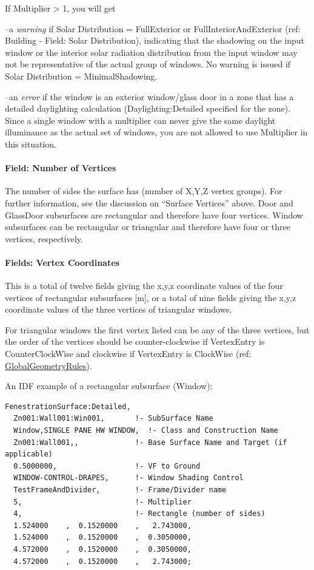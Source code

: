 If Multiplier \textgreater{} 1, you will get

--a \emph{warning} if Solar Distribution = FullExterior or FullInteriorAndExterior (ref: Building - Field: Solar Distribution), indicating that the shadowing on the input window or the interior solar radiation distribution from the input window may not be representative of the actual group of windows. No warning is issued if Solar Distribution = MinimalShadowing.

--an \emph{error} if the window is an exterior window/glass door in a zone that has a detailed daylighting calculation (Daylighting:Detailed specified for the zone). Since a single window with a multiplier can never give the same daylight illuminance as the actual set of windows, you are not allowed to use Multiplier in this situation.

\paragraph{Field: Number of Vertices}\label{field-number-of-vertices-4}

The number of sides the surface has (number of X,Y,Z vertex groups). For further information, see the discussion on ``Surface Vertices'' above. Door and GlassDoor subsurfaces are rectangular and therefore have four vertices. Window subsurfaces can be rectangular or triangular and therefore have four or three vertices, respectively.

\paragraph{Fields: Vertex Coordinates}\label{fields-vertex-coordinates}

This is a total of twelve fields giving the x,y,z coordinate values of the four vertices of rectangular subsurfaces {[}m{]}, or a total of nine fields giving the x,y,z coordinate values of the three vertices of triangular windows.

For triangular windows the first vertex listed can be any of the three vertices, but the order of the vertices should be counter-clockwise if VertexEntry is CounterClockWise and clockwise if VertexEntry is ClockWise (ref: \hyperref[globalgeometryrules]{GlobalGeometryRules}).

An IDF example of a rectangular subsurface (Window):

\begin{lstlisting}
FenestrationSurface:Detailed,
  Zn001:Wall001:Win001,       !- SubSurface Name
  Window,SINGLE PANE HW WINDOW,  !- Class and Construction Name
  Zn001:Wall001,,             !- Base Surface Name and Target (if applicable)
  0.5000000,                  !- VF to Ground
  WINDOW-CONTROL-DRAPES,      !- Window Shading Control
  TestFrameAndDivider,        !- Frame/Divider name
  5,                          !- Multiplier
  4,                          !- Rectangle (number of sides)
  1.524000    ,  0.1520000    ,   2.743000,
  1.524000    ,  0.1520000    ,  0.3050000,
  4.572000    ,  0.1520000    ,  0.3050000,
  4.572000    ,  0.1520000    ,   2.743000;
\end{lstlisting}

